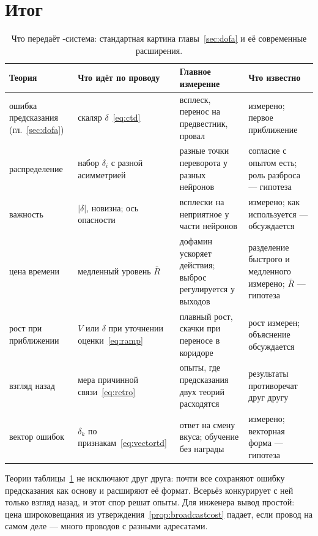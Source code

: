 \section{Итог}

\begin{table}[t]
\centering
\footnotesize
\setlength{\tabcolsep}{4pt}
\renewcommand{\arraystretch}{1.15}
\begin{tabular}{>{\raggedright}p{2.5cm}>{\raggedright}p{3.2cm}>{\raggedright}p{3.6cm}>{\raggedright\arraybackslash}p{4.2cm}}
\toprule
Теория & Что идёт по проводу & Главное измерение & Что известно \\
\midrule
ошибка предсказания (гл.~\ref{sec:dofa}) & скаляр $\delta$~\eqref{eq:ctd} & всплеск, перенос на предвестник, провал & измерено; первое приближение \\
распределение & набор $\delta_i$ с разной асимметрией & разные точки переворота у разных нейронов & согласие с опытом есть; роль разброса --- гипотеза \\
важность & $|\delta|$, новизна; ось опасности & всплески на неприятное у части нейронов & измерено; как используется --- обсуждается \\
цена времени & медленный уровень $\bar R$ & дофамин ускоряет действия; выброс регулируется у выходов & разделение быстрого и медленного измерено; $\bar R$ --- гипотеза \\
рост при приближении & $V$ или $\delta$ при уточнении оценки~\eqref{eq:ramp} & плавный рост, скачки при переносе в коридоре & рост измерен; объяснение обсуждается \\
взгляд назад & мера причинной связи~\eqref{eq:retro} & опыты, где предсказания двух теорий расходятся & результаты противоречат друг другу \\
вектор ошибок & $\delta_k$ по признакам~\eqref{eq:vectortd} & ответ на смену вкуса; обучение без награды & измерено; векторная форма --- гипотеза \\
\bottomrule
\end{tabular}
\caption{Что передаёт -система: стандартная картина главы~\ref{sec:dofa} и её современные расширения.}
\label{tab:dofaalt}
\end{table}

Теории таблицы~\ref{tab:dofaalt} не исключают друг друга: почти все сохраняют ошибку предсказания как основу и расширяют её формат. Всерьёз конкурирует с ней только взгляд назад, и этот спор решат опыты. Для инженера вывод простой: цена широковещания из утверждения~\ref{prop:broadcastcost} падает, если провод на самом деле --- много проводов с разными адресатами.
